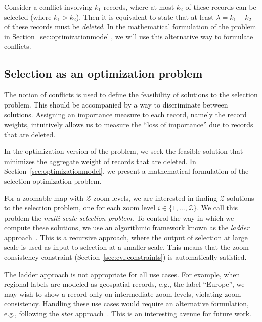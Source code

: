 \documentclass[11pt, oneside]{report}
\begin{document}
{Consider a conflict involving $k_1$ records, where at most $k_2$ of these records can be selected (where $k_1 > k_2$). Then it is equivalent to state that at least $\lambda = k_1 - k_2$ of these records must be \emph{deleted}. In the mathematical formulation of the problem in Section~\ref{sec:optimizationmodel}, we will use this alternative way to formulate conflicts.

\subsection{Selection as an optimization problem}
\label{sec:cvl:filtering}
The notion of conflicts is used to define the feasibility of solutions to the selection problem. This should be accompanied by a way to discriminate between solutions. Assigning an importance measure to each record, namely the record weights, intuitively allows us to measure the ``loss of importance'' due to records that are deleted.

In the optimization version of the problem, we seek the feasible solution that minimizes the aggregate weight of records that are deleted. In Section~\ref{sec:optimizationmodel}, we present a mathematical formulation of the selection optimization problem.

For a zoomable map with $\mathcal{Z}$ zoom levels, we are interested in finding $\mathcal{Z}$ solutions to the selection problem, one for each zoom level $i \in \{ 1, \ldots, \mathcal{Z} \}$. We call this problem the \emph{multi-scale selection problem}. To control the way in which we compute these solutions, we use an algorithmic framework known as the \emph{ladder} approach~\cite{foerster2010challenges}. This is a recursive approach, where the output of selection at large scale is used as input to selection at a smaller scale. This means that the zoom-consistency constraint (Section~\ref{sec:cvl:constraints}) is automatically satisfied.

The ladder approach is not appropriate for all use cases. For example, when regional labels are modeled as geospatial records, e.g., the label ``Europe'', we may wish to show a record only on intermediate zoom levels, violating zoom consistency. Handling these use cases would require an alternative formulation, e.g., following the \emph{star} approach~\cite{foerster2010challenges}. This is an interesting avenue for future work.  


}
\end{document}
